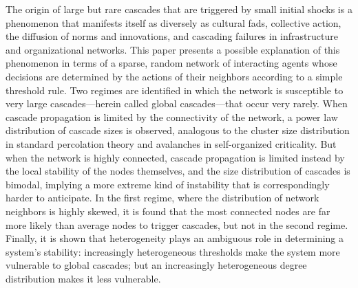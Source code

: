 The origin of large but rare cascades that are triggered by small initial shocks is a phenomenon that manifests itself as diversely as cultural fads, collective action, the diffusion of norms and innovations, and cascading failures in infrastructure and organizational networks. This paper presents a possible explanation of this phenomenon in terms of a sparse, random network of interacting agents whose decisions are determined by the actions of their neighbors according to a simple threshold rule. Two regimes are identified in which the network is susceptible to very large cascades—herein called global cascades—that occur very rarely. When cascade propagation is limited by the connectivity of the network, a power law distribution of cascade sizes is observed, analogous to the cluster size distribution in standard percolation theory and avalanches in self-organized criticality. But when the network is highly connected, cascade propagation is limited instead by the local stability of the nodes themselves, and the size distribution of cascades is bimodal, implying a more extreme kind of instability that is correspondingly harder to anticipate. In the first regime, where the distribution of network neighbors is highly skewed, it is found that the most connected nodes are far more likely than average nodes to trigger cascades, but not in the second regime. Finally, it is shown that heterogeneity plays an ambiguous role in determining a system's stability: increasingly heterogeneous thresholds make the system more vulnerable to global cascades; but an increasingly heterogeneous degree distribution makes it less vulnerable.
